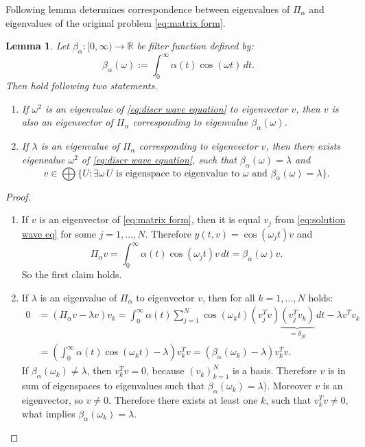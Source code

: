 \documentclass[a4paper,11pt,bibliography=totoc,listof=totoc,headinclude=true,cleardoublepage=empty,oneside]{scrbook}
\newtheorem{lemma}[theorem]{Lemma}
\newcommand{\R}{\mathbb{R}}
\begin{document}
Following lemma determines correspondence between eigenvalues of $\Pi_\alpha$ and eigenvalues of the original problem \eqref{eq:matrix form}.
\begin{lemma}
    Let $\beta_\alpha : [0, \infty) \rightarrow \R$ be filter function defined by:
    \begin{equation}\label{eq:cont filter function}
        \beta_\alpha(\omega) := \int_0^\infty \alpha(t) \cos(\omega t) \,dt. 
    \end{equation}
    Then hold following two statements.
    \begin{enumerate}
        \item If $\omega^2$ is an eigenvalue of \eqref{eq:discr wave equation} to eigenvector $v$, then $v$ is also an eigenvector of $\Pi_\alpha$ corresponding to eigenvalue $\beta_\alpha(\omega)$. 
        \item If $\lambda$ is an eigenvalue of $\Pi_\alpha$ corresponding to eigenvector $v$, then there exists eigenvalue $\omega^2$ of \eqref{eq:discr wave equation}, such that $\beta_\alpha (\omega) = \lambda$ and 
        \begin{equation*}
            v \in \bigoplus\{ U : \exists \omega \, U \text{ is eigenspace to eigenvalue to } \omega \text{ and } \beta_\alpha(\omega) = \lambda\}.
        \end{equation*}
    \end{enumerate}
\end{lemma}
\begin{proof}
    \begin{enumerate}
        \item If $v$ is an eigenvector of \eqref{eq:matrix form}, then it is equal $v_j$ from \eqref{eq:solution wave eq} for some $j=1, \dots, N$. Therefore $y(t, v) = \cos(\omega_j t)v$ and 
        \begin{equation*}
            \Pi_\alpha v = \int_0^\infty \alpha(t) \cos(\omega_j t) v \, dt = \beta_\alpha(\omega) v.
        \end{equation*}
        So the first claim holds.
        \item If $\lambda$ is an eigenvalue of $\Pi_\alpha$ to eigenvector $v$, then for all $k=1, \dots, N$ holds:
        \begin{align*}
             0 &= (\Pi_\alpha v - \lambda v)v_k = \int_0^\infty \alpha(t) \sum_{j=1}^N \cos(\omega_k t) (v_j^T v)\underbrace{(v_j^T v_k)}_{=\delta_{jk}} \, dt - \lambda v^Tv_k \\ &= \left(\int_0^\infty \alpha(t) \cos(\omega_kt) - \lambda \right)v_k^T v = (\beta_\alpha(\omega_k) - \lambda)v_k^T v.
        \end{align*}
        If $\beta_\alpha (\omega_k)\neq \lambda$, then $v_k^Tv = 0$, because $(v_k)_{k=1}^N$ is a basis. Therefore $v$ is in sum of eigenspaces to eigenvalues such that $\beta_\alpha(\omega_k) = \lambda)$. Moreover $v$ is an eigenvector, so $v\neq 0$. Therefore there exists at least one $k$, such that $v_k^T v \neq 0$, what implies $\beta_\alpha (\omega_k) = \lambda$. 
    \end{enumerate}
\end{proof}
\end{document}
